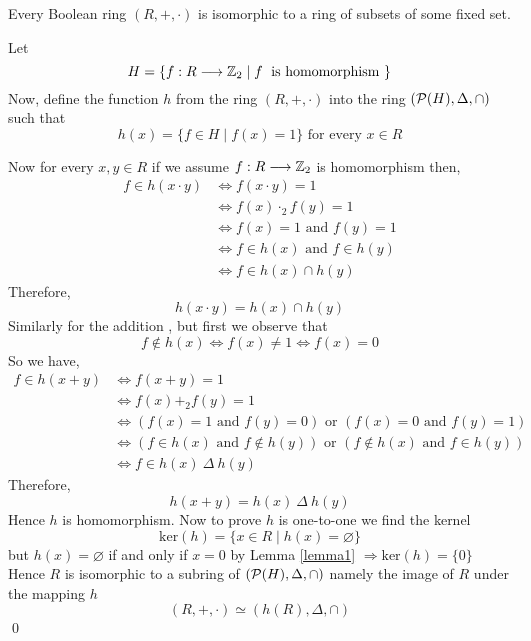 \begin{theo}
 Every Boolean ring $(R,+,\cdot)$ is isomorphic to a ring of subsets of some fixed set.   
\end{theo}
\begin{myproof}
    Let \[
    H=\left\{f: R \longrightarrow \mathbb{Z}_2 \mid f\right.\text{ is homomorphism }\}
    \]    
Now, define the function \(h\) from the ring \((R,+,\cdot)\) into the ring \((\mathcal{P}(H),\Delta,\cap)\) such that 
\[
h(x) = \{f\in H \mid f(x)=1\} \text{ for every } x\in R
\]

\noindent Now for every $x, y \in R$ if we assume \(f:R\longrightarrow\mathbb{Z}_2\) is homomorphism then,
\begin{align*}
f\in h(x\cdot y) &\Longleftrightarrow f(x\cdot y)=1
\\&\Longleftrightarrow f(x)\cdot_2 f(y)=1\\&\Longleftrightarrow f(x)=1 \text{ and } f(y)=1\\&\Longleftrightarrow f\in h(x) \text{ and } f\in h(y)\\&\Longleftrightarrow f\in h(x)\cap h(y)
\end{align*}
Therefore,  $$h(x \cdot y)=h(x) \cap h(y)$$
Similarly for the addition , but first we observe that
\[
f \notin h(x) \Longleftrightarrow f(x)\neq 1 \Longleftrightarrow f(x)=0
\]
So we have,
\begin{align*}
  f \in h(x+y) &\Longleftrightarrow f(x+y)=1\\&\Longleftrightarrow f(x)+_2f(y)=1\\&\Longleftrightarrow (f(x)=1 \text{ and }f(y)=0)\text{ or }(f(x)=0\text{ and }f(y)=1)\\&\Longleftrightarrow (f\in h(x)\text{ and }f\notin h(y))\text{ or }(f\notin h(x)\text{ and }f\in h(y))\\&\Longleftrightarrow f\in h(x)\ \Delta\ h(y)
\end{align*}
Therefore,
\[h(x+y)=h(x)\ \Delta\ h(y)\]
Hence $h$ is homomorphism. Now to prove $h$ is one-to-one we find the kernel
\[\text{ker}(h)=\{x\in R\mid h(x)=\varnothing\}\]
but \(h(x)=\varnothing\) if and only if \(x=0\) by Lemma \ref{lemma1} \(\Longrightarrow \text{ker}(h)=\{0\}\)
Hence $R$ is isomorphic to a subring of $(\mathcal{P}(H),\Delta,\cap)$ namely the image of $R$ under the mapping $h$
\[(R,+,\cdot)\simeq (h(R),\Delta,\cap)\]\qed
\end{myproof}